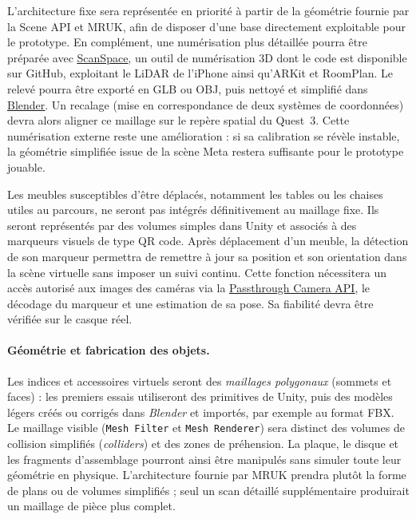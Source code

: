 \documentclass[11pt,a4paper]{article}
\newcommand{\doclink}[2]{\href{#1}{\textcolor{linkBlue}{\underline{#2}}}}
\begin{document}
L'architecture fixe sera représentée en priorité à partir de la géométrie fournie par la Scene API et MRUK, afin de disposer d'une base directement exploitable pour le prototype. En complément, une numérisation plus détaillée pourra être préparée avec \doclink{https://github.com/aabdlwahab/3d-scanner}{ScanSpace}, un outil de numérisation 3D dont le code est disponible sur GitHub, exploitant le LiDAR de l'iPhone ainsi qu'ARKit et RoomPlan. Le relevé pourra être exporté en GLB ou OBJ, puis nettoyé et simplifié dans \doclink{https://www.blender.org/}{Blender}. Un recalage (mise en correspondance de deux systèmes de coordonnées) devra alors aligner ce maillage sur le repère spatial du Quest~3. Cette numérisation externe reste une amélioration : si sa calibration se révèle instable, la géométrie simplifiée issue de la scène Meta restera suffisante pour le prototype jouable.

Les meubles susceptibles d'être déplacés, notamment les tables ou les chaises utiles au parcours, ne seront pas intégrés définitivement au maillage fixe. Ils seront représentés par des volumes simples dans Unity et associés à des marqueurs visuels de type QR code. Après déplacement d'un meuble, la détection de son marqueur permettra de remettre à jour sa position et son orientation dans la scène virtuelle sans imposer un suivi continu. Cette fonction nécessitera un accès autorisé aux images des caméras via la \doclink{https://developers.meta.com/vr/documentation/unity/unity-pca-documentation/}{Passthrough Camera API}, le décodage du marqueur et une estimation de sa pose. Sa fiabilité devra être vérifiée sur le casque réel.

\paragraph{Géométrie et fabrication des objets.} Les indices et accessoires virtuels seront des \emph{maillages polygonaux} (sommets et faces) : les premiers essais utiliseront des primitives de Unity, puis des modèles légers créés ou corrigés dans \emph{Blender} et importés, par exemple au format FBX. Le maillage visible (\texttt{Mesh Filter} et \texttt{Mesh Renderer}) sera distinct des volumes de collision simplifiés (\emph{colliders}) et des zones de préhension. La plaque, le disque et les fragments d'assemblage pourront ainsi être manipulés sans simuler toute leur géométrie en physique. L'architecture fournie par MRUK prendra plutôt la forme de plans ou de volumes simplifiés ; seul un scan détaillé supplémentaire produirait un maillage de pièce plus complet.
\end{document}
